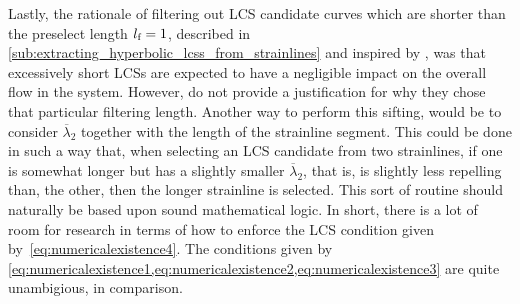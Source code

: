 Lastly, the rationale of filtering out LCS candidate curves which are shorter
than the preselect length $l_{\textnormal{f}}=1$, described in
\cref{sub:extracting_hyperbolic_lcss_from_strainlines} and inspired by
\textcite{farazmand2012computing}, was that excessively short LCSs are
expected to have a negligible impact on the overall flow in the system.
However, \citeauthor{farazmand2012computing} do not provide a justification
for why they chose that particular filtering length. Another way to perform this
sifting, would be to consider $\overline{\lambda}_{2}$ together with the length
of the strainline segment. This could be done in such a way that, when selecting
an LCS candidate from two strainlines, if one is somewhat longer but has a
slightly smaller $\overline{\lambda}_{2}$, that is, is slightly less repelling
than, the other, then the longer strainline is selected. This sort of routine
should naturally be based upon sound mathematical logic. In short, there is a
lot of room for research in terms of how to enforce the LCS condition given
by~\cref{eq:numericalexistence4}. The conditions given by
\cref{eq:numericalexistence1,eq:numericalexistence2,eq:numericalexistence3}
are quite unambigious, in comparison.

